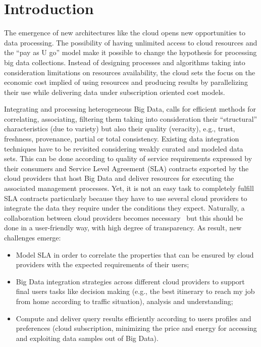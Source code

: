 \section{Introduction}
\label{sec:intro}


The emergence of new architectures like the cloud opens new opportunities to data processing. 
The possibility of having unlimited access to cloud resources and the ``pay as U go'' model make it possible to change the hypothesis for processing big  data collections.  Instead of designing processes and algorithms taking into consideration  limitations on resources availability, the cloud sets the focus on the economic cost implied of using resources and producing results by parallelizing their use while delivering data under subscription oriented cost models.
 
Integrating and processing heterogeneous Big Data, calls for efficient methods for correlating, associating, filtering them taking into consideration their ``structural'' characteristics (due to variety) but also their quality (veracity), e.g., trust, freshness, provenance, partial or total consistency. 
Existing data integration techniques have to be revisited considering weakly curated and modeled data sets. This can be done according to quality of service requirements expressed by their consumers and Service Level Agreement (SLA) contracts exported by the cloud providers that host  Big Data and deliver resources for executing the associated management processes. Yet, it is not an easy task to completely fulfill   SLA contracts particularly because they have to use several cloud providers to integrate the data they require under the conditions they expect.
Naturally, a collaboration between cloud providers becomes necessary~\cite{036} but this should be done in a user-friendly way, with high degree of transparency. As result, new challenges emerge: 
\begin{itemize}
\item Model SLA  in order to correlate the  properties that can be ensured by cloud providers with the expected requirements of their users;  
\item Big Data integration strategies across different cloud providers  to support final users tasks like decision making (e.g., the best itinerary to reach my job from home according to traffic situation), analysis and understanding; 
\item Compute and deliver query results efficiently according to users profiles and preferences (cloud subscription, minimizing the price and energy for accessing and exploiting data samples out of Big Data).
\end{itemize}

